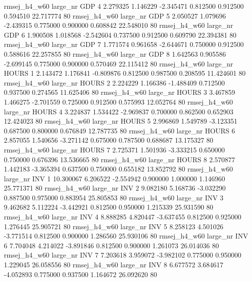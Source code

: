 rmsej_h4_w60   large_nr      GDP                 4  2.279325  1.146229  -2.345471 0.812500 0.912500  0.594510   22.717774 80
rmsej_h4_w60   large_nr      GDP                 5  2.050527  1.079696  -2.439315 0.775000 0.900000  0.608842   22.548010 80
rmsej_h4_w60   large_nr      GDP                 6  1.900508  1.018568  -2.542604 0.737500 0.912500  0.609790   22.394381 80
rmsej_h4_w60   large_nr      GDP                 7  1.771574  0.961658  -2.644671 0.750000 0.912500  0.588616   22.257855 80
rmsej_h4_w60   large_nr      GDP                 8  1.642563  0.905586  -2.699145 0.775000 0.900000  0.570469   22.115412 80
rmsej_h4_w60   large_nr    HOURS                 1  2.143472  1.176841  -0.809876 0.812500 0.987500  0.208595   11.424601 80
rmsej_h4_w60   large_nr    HOURS                 2  2.224229  1.166386  -1.488409 0.712500 0.937500  0.274565   11.625406 80
rmsej_h4_w60   large_nr    HOURS                 3  3.467859  1.466275  -2.701559 0.725000 0.912500  0.575993   12.052764 80
rmsej_h4_w60   large_nr    HOURS                 4  3.224837  1.534422  -2.969837 0.700000 0.862500  0.652903   12.424023 80
rmsej_h4_w60   large_nr    HOURS                 5  2.996869  1.549789  -3.123351 0.687500 0.800000  0.676849   12.787735 80
rmsej_h4_w60   large_nr    HOURS                 6  2.857055  1.540656  -3.271142 0.675000 0.787500  0.688687   13.175327 80
rmsej_h4_w60   large_nr    HOURS                 7  2.725371  1.501936  -3.333215 0.650000 0.750000  0.676396   13.536665 80
rmsej_h4_w60   large_nr    HOURS                 8  2.570877  1.442183  -3.365394 0.637500 0.750000  0.655182   13.852792 80
rmsej_h4_w60   large_nr      INV                 1 10.300067  6.206522  -2.554942 0.900000 1.000000  1.146960   25.771371 80
rmsej_h4_w60   large_nr      INV                 2  9.082180  5.168736  -3.032290 0.887500 0.975000  0.883954   25.805853 80
rmsej_h4_w60   large_nr      INV                 3  9.462682  5.112224  -3.442921 0.812500 0.950000  1.215339   25.931590 80
rmsej_h4_w60   large_nr      INV                 4  8.888285  4.820447  -3.637455 0.812500 0.925000  1.276445   25.905721 80
rmsej_h4_w60   large_nr      INV                 5  8.258123  4.501026  -3.771514 0.812500 0.900000  1.286560   25.930106 80
rmsej_h4_w60   large_nr      INV                 6  7.704048  4.214022  -3.891846 0.812500 0.900000  1.261073   26.014036 80
rmsej_h4_w60   large_nr      INV                 7  7.203618  3.959072  -3.982102 0.775000 0.950000  1.229045   26.058556 80
rmsej_h4_w60   large_nr      INV                 8  6.677572  3.684617  -4.052893 0.775000 0.937500  1.164672   26.092620 80

